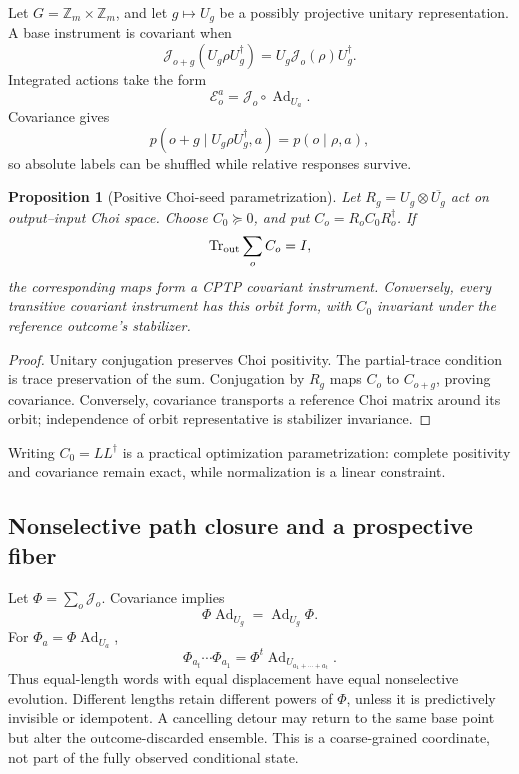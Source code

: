 \documentclass[11pt]{article}
\newtheorem{proposition}[theorem]{Proposition}
\theoremstyle{definition}
\theoremstyle{remark}
\newcommand{\cE}{\mathcal E}
\newcommand{\cJ}{\mathcal J}
\newcommand{\Tr}{\operatorname{Tr}}
\newcommand{\Z}{\mathbb Z}
\begin{document}
Let \(G=\Z_m\times\Z_m\), and let \(g\mapsto U_g\) be a possibly projective
unitary representation. A base instrument is covariant when
\[
\cJ_{o+g}(U_g\rho U_g^\dagger)
=U_g\cJ_o(\rho)U_g^\dagger.
\tag{3.1}
\]
Integrated actions take the form
\[
\cE_o^a=\cJ_o\circ\operatorname{Ad}_{U_a}.
\tag{3.2}
\]
Covariance gives
\[
p(o+g\mid U_g\rho U_g^\dagger,a)=p(o\mid\rho,a),
\]
so absolute labels can be shuffled while relative responses survive.

\begin{proposition}[Positive Choi-seed parametrization]
\label{prop:choi}
Let \(R_g=U_g\otimes\overline{U_g}\) act on output--input Choi space. Choose
\(C_0\succeq0\), and put \(C_o=R_oC_0R_o^\dagger\). If
\[
\Tr_{\rm out}\sum_oC_o=I,
\]
the corresponding maps form a CPTP covariant instrument. Conversely, every
transitive covariant instrument has this orbit form, with \(C_0\) invariant
under the reference outcome's stabilizer.
\end{proposition}
\begin{proof}
Unitary conjugation preserves Choi positivity. The partial-trace condition is
trace preservation of the sum. Conjugation by \(R_g\) maps \(C_o\) to
\(C_{o+g}\), proving covariance. Conversely, covariance transports a
reference Choi matrix around its orbit; independence of orbit representative
is stabilizer invariance.
\end{proof}

Writing \(C_0=LL^\dagger\) is a practical optimization parametrization:
complete positivity and covariance remain exact, while normalization is a
linear constraint.

\subsection{Nonselective path closure and a prospective fiber}

Let \(\Phi=\sum_o\cJ_o\). Covariance implies
\[
\Phi\operatorname{Ad}_{U_g}=
\operatorname{Ad}_{U_g}\Phi.
\]
For \(\Phi_a=\Phi\operatorname{Ad}_{U_a}\),
\begin{equation}
\Phi_{a_t}\cdots\Phi_{a_1}
=\Phi^t\operatorname{Ad}_{U_{a_1+\cdots+a_t}}.
\label{eq:path}
\end{equation}
Thus equal-length words with equal displacement have equal nonselective
evolution. Different lengths retain different powers of \(\Phi\), unless it
is predictively invisible or idempotent. A cancelling detour may return to the
same base point but alter the outcome-discarded ensemble. This is a
coarse-grained coordinate, not part of the fully observed conditional state.
\end{document}
